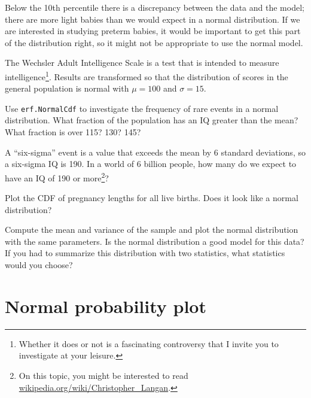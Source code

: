 \documentclass[12pt]{book}
\begin{document}

Below the 10th percentile there is a discrepancy between the data
and the model; there are more light babies than we would expect in
a normal distribution.  If we are interested in studying preterm
babies, it would be important to get this part of the distribution
right, so it might not be appropriate to use the normal
model.

\begin{exercise}
The Wechsler Adult Intelligence Scale is a test that is intended
to measure intelligence\footnote{Whether it does or not is a
fascinating controversy that I invite you to investigate at your
leisure.}.  Results are transformed so that the distribution of scores
in the general population is normal with $\mu=100$ and $\sigma=15$.


Use {\tt erf.NormalCdf} to investigate the frequency of rare events in
a normal distribution.  What fraction of the population has an IQ
greater than the mean?  What fraction is over 115?  130?  145?

A ``six-sigma'' event is a value that exceeds the mean by 6 standard
deviations, so a six-sigma IQ is 190.  In a world of 6 billion people,
how many do we expect to have an IQ of 190 or more\footnote{On this
  topic, you might be interested to read
  \url{wikipedia.org/wiki/Christopher_Langan}.}?


\end{exercise}


\begin{exercise}
Plot the CDF of pregnancy lengths for all live births.  Does it
look like a normal distribution?


Compute the mean and variance of the sample and plot the normal
distribution with the same parameters.  Is the normal distribution a
good model for this data?  If you had to summarize this distribution
with two statistics, what statistics would you choose?

\end{exercise}


\section{Normal probability plot}
\end{document}
